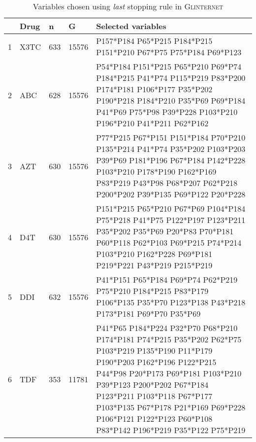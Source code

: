 \begin{table}[ht]
\centering
\begin{tabular}{rllll}
  \hline
 & Drug & n & G & Selected variables \\ 
  \hline
1 & X3TC & 633 & 15576 & P157*P184 P65*P215 P184*P215 P151*P210 P67*P75 P75*P184 P69*P123 \\ 
  2 & ABC & 628 & 15576 & P54*P184 P151*P215 P65*P210 P69*P74 P184*P215 P41*P74 P115*P219 P83*P200 P174*P181 P106*P177 P35*P202 P190*P218 P184*P210 P35*P69 P69*P184 P41*P69 P75*P98 P39*P228 P103*P210 P196*P210 P41*P211 P62*P162 \\ 
  3 & AZT & 630 & 15576 & P77*P215 P67*P151 P151*P184 P70*P210 P135*P214 P41*P74 P35*P202 P103*P203 P39*P69 P181*P196 P67*P184 P142*P228 P103*P210 P178*P190 P162*P169 P83*P219 P43*P98 P68*P207 P62*P218 P200*P202 P39*P135 P69*P122 P20*P228 \\ 
  4 & D4T & 630 & 15576 & P151*P215 P65*P210 P67*P69 P104*P184 P75*P218 P41*P75 P122*P197 P123*P211 P35*P202 P35*P69 P20*P83 P70*P181 P60*P118 P62*P103 P69*P215 P74*P214 P103*P210 P162*P228 P69*P181 P219*P221 P43*P219 P215*P219 \\ 
  5 & DDI & 632 & 15576 & P41*P151 P65*P184 P69*P74 P62*P219 P75*P210 P184*P215 P83*P179 P106*P135 P35*P70 P123*P138 P43*P218 P173*P181 P69*P70 P35*P69 \\ 
  6 & TDF & 353 & 11781 & P41*P65 P184*P224 P32*P70 P68*P210 P174*P181 P74*P215 P35*P202 P62*P75 P103*P219 P135*P190 P11*P179 P190*P203 P162*P196 P122*P215 P44*P98 P20*P173 P69*P181 P103*P210 P39*P123 P200*P202 P67*P184 P123*P211 P103*P118 P67*P177 P103*P135 P67*P178 P21*P169 P69*P228 P106*P121 P122*P123 P60*P108 P83*P142 P196*P219 P35*P122 P75*P219 \\ 
   \hline
\end{tabular}
\caption{Variables chosen using \textit{last} stopping rule in
  \textsc{Glinternet}} 
\label{tab:glintNRTI}
\end{table}

